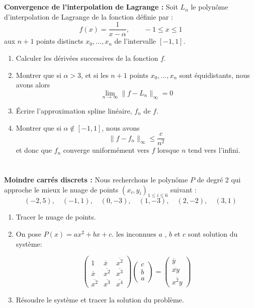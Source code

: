 \documentclass[a4paper]{article}
\begin{document}
\section{} {\bf Convergence de l'interpolation de Lagrange : } Soit $L_n$ le polynôme d'interpolation de Lagrange de la fonction définie par :
\[f(x) = \frac 1{x-\alpha},\qquad -1\leq x \leq 1 \]
aux $n + 1$ points distincts $x_0, ..., x_n$ de l'intervalle $[-1,1]$.
\begin{enumerate}
\item Calculer les dérivées successives de la fonction $f$.
\item  Montrer que si $\alpha > 3$, et si les $n + 1$ points $x_0, ..., x_n$ sont équidistants, nous avons alors
\[\lim_{n\to \infty}\|f-L_n\|_{\infty}=0\]
\item Écrire l'approximation spline linéaire, $f_n$ de $f$.
\item  Montrer que si $\alpha \notin [-1,1]$, nous avons
\[\|f-f_n\|_{ \infty}\leq \frac c{n^2}\]
et donc que $f_n$ converge uniformément vers $f$ lorsque $n$ tend vers l'infini.
\end{enumerate}

\section{} {\bf Moindre carrés discrets : }
Nous recherchons le polynôme $P$ de degré 2 qui approche le mieux le nuage de points $(x_i, y_i)_{1\leq i\leq 6}$  suivant :
\[(-2,5),\quad(-1,1),\quad (0, -3),\quad (1, -3),\quad (2, -2),\quad (3, 1)\]

\begin{enumerate}
\item  Tracer le nuage de points.
\item On pose $P(x)=ax^2+bx+c$. les inconnues $a$ , $b$ et $c$ sont solution du système:

\[\left(\begin{array}{ccc}
1 & \overline{x} & \overline{x^2}\\
\overline{x} & \overline{x^2} & \overline{x^3} \\
 \overline{x^2} & \overline{x^3} & \overline{x^4} 
\end{array}\right) \left(\begin{array}{c}
c \\
b \\
a 
\end{array}
\right) =\left(\begin{array}{c}
\overline{y} \\
\overline{x y} \\
\overline{x^2 y} 
\end{array}
\right) 
\]

\item  Résoudre le système et tracer la solution du problème.
\end{enumerate}
\end{document}
